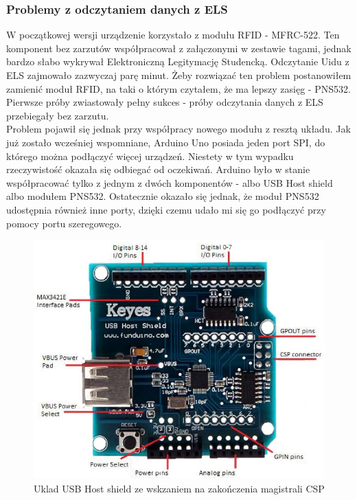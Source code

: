 \documentclass[declaration,shortabstract, mgr]{iithesis}
\begin{document}
\subsubsection{Problemy z odczytaniem danych z ELS}
\indent W początkowej wersji urządzenie korzystało z modułu RFID - MFRC-522. Ten komponent bez zarzutów współpracował z załączonymi w zestawie tagami, jednak bardzo słabo wykrywał Elektroniczną Legitymację Studencką. Odczytanie Uidu z ELS zajmowało zazwyczaj parę minut. Żeby rozwiązać ten problem postanowiłem zamienić moduł RFID, na taki o którym czytałem, że ma lepszy zasięg - PNS532. Pierwsze próby zwiastowały pełny sukces - próby odczytania danych z ELS przebiegały bez zarzutu. \\
\indent Problem pojawił się jednak przy współpracy nowego modułu z resztą układu. Jak już zostało wcześniej wspomniane, Arduino Uno posiada jeden port SPI, do którego można podłączyć więcej urządzeń. Niestety w tym wypadku rzeczywistość okazała się odbiegać od oczekiwań. Arduino było w stanie współpracować tylko z jednym z dwóch komponentów - albo USB Host shield albo modułem PNS532. Ostatecznie okazało się jednak, że moduł PNS532 udostępnia również inne porty, dzięki czemu udało mi się go podłączyć przy pomocy portu szeregowego.
\begin{figure}[h]
\caption{Uklad USB Host shield ze wskzaniem na zakończenia magistrali CSP}
\centering
\includegraphics[scale=0.6]{usb_host_shield.jpg}
\end{figure}
\end{document}
